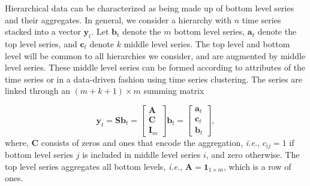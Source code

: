 \documentclass[a4paper,review,12pt,authoryear]{elsarticle}
\begin{document}
Hierarchical data can be characterized as being made up of bottom level series and their aggregates. In general, we consider a hierarchy with $n$ time series stacked into a vector $\boldsymbol{y}_t$. Let $\boldsymbol{b}_t$ denote the $m$ bottom level series, $\boldsymbol{a}_t$ denote the top level series, and $\boldsymbol{c}_t$ denote $k$ middle level series. The top level and bottom level will be common to all hierarchies we consider, and are augmented by middle level series. These middle level series can be formed according to attributes of the time series or in a data-driven fashion using time series clustering. The series are linked through an $(m+k+1)\times m$ summing matrix 

\[
  \boldsymbol{y}_t = \boldsymbol{S}\boldsymbol{b}_t = \begin{bmatrix}
    \boldsymbol{A} \\\boldsymbol{C} \\ \boldsymbol{I}_m 
  \end{bmatrix}  \boldsymbol{b}_t = \begin{bmatrix}
      \boldsymbol{a}_t \\ \boldsymbol{c}_t \\\boldsymbol{b}_t
  \end{bmatrix},
\]
where, $\boldsymbol{C}$ consists of zeros and ones that encode the aggregation, \textit{i.e.}, $c_{ij}=1$ if bottom level series $j$ is included in middle level series $i$, and zero otherwise. The top level series aggregates all bottom levels, \textit{i.e.}, $\boldsymbol{A} = \mathbf{1}_{1\times m}$, which is a row of ones.



\end{document}
